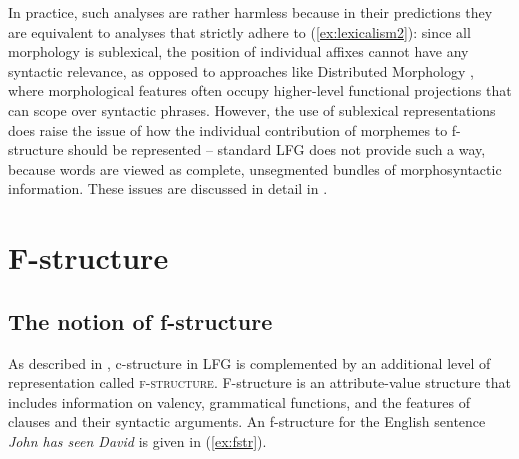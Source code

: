 \documentclass[output=paper,hidelinks]{langscibook}
\begin{document}
\noindent In practice, such analyses are rather harmless because in their predictions they are equivalent to analyses that strictly adhere to (\ref{ex:lexicalism2}): since all morphology is sublexical, the position of individual affixes cannot have any syntactic relevance, as opposed to approaches like Distributed Morphology \citep{hallemarantz}, where morphological features often occupy higher-level functional projections that can scope over syntactic phrases. However, the use of sublexical representations does raise the issue of how the individual contribution of morphemes to f-structure should be represented -- standard LFG does not provide such a way, because words are viewed as complete, unsegmented bundles of morphosyntactic information. These issues are discussed in detail in .
 
 \section{F-structure\label{sect:f-structure}}
 
 \subsection{The notion of f-structure\label{sect:identity}}
 
 As described in , c-structure in LFG is complemented by an additional level of representation called \textsc{f-structure}. F-struc\-ture is an attribute-value structure that includes information on valency, grammatical functions, and the features of clauses and their syntactic arguments. An f-structure for the English sentence \textit{John has seen David} is given in (\ref{ex:fstr}).
 
\end{document}
